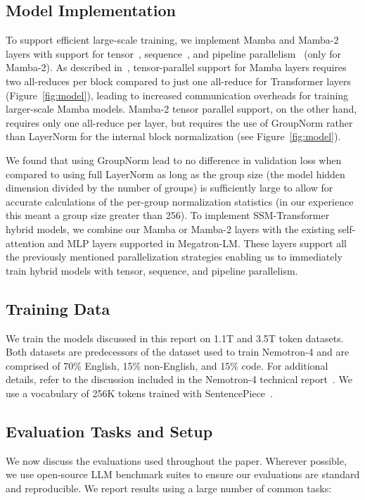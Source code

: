 \subsection{Model Implementation} To support efficient large-scale training, we implement Mamba and Mamba-2 layers with support for tensor~\citep{shoeybi2019megatron}, sequence~\citep{korthikanti2205reducing}, and pipeline parallelism~\citep{narayanan2021efficient} (only for Mamba-2). As described in~\cite{dao2024transformers}, tensor-parallel support for Mamba layers requires two all-reduces per block compared to just one all-reduce for Transformer layers (Figure~\ref{fig:model}), leading to increased communication overheads for training larger-scale Mamba models. Mamba-2 tensor parallel support, on the other hand, requires only one all-reduce per layer, but requires the use of GroupNorm rather than LayerNorm for the internal block normalization (see Figure~\ref{fig:model}). 

We found that using GroupNorm lead to no difference in validation loss when compared to using full LayerNorm as long as the group size (the model hidden dimension divided by the number of groups) is sufficiently large to allow for accurate calculations of the per-group normalization statistics (in our experience this meant a group size greater than 256). To implement SSM-Transformer hybrid models, we combine our Mamba or Mamba-2 layers with the existing self-attention and MLP layers supported in Megatron-LM. These layers support all the previously mentioned parallelization strategies enabling us to immediately train hybrid models with tensor, sequence, and pipeline parallelism.

\subsection{Training Data} We train the models discussed in this report on 1.1T and 3.5T token datasets. Both datasets are predecessors of the dataset used to train Nemotron-4 and are comprised of 70\% English, 15\% non-English, and 15\% code. For additional details, refer to the discussion included in the Nemotron-4 technical report~\citep{parmar2024nemotron}. We use a vocabulary of 256K tokens trained with SentencePiece~\citep{kudo2018sentencepiece}.

\subsection{Evaluation Tasks and Setup} We now discuss the evaluations used throughout the paper. Wherever possible, we use open-source LLM benchmark suites to ensure our evaluations are standard and reproducible. We report results using a large number of common tasks:

